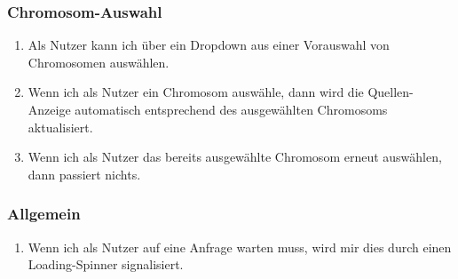 \subsubsection{Chromosom-Auswahl}
\begin{enumerate}
	\item Als Nutzer kann ich über ein Dropdown aus einer Vorauswahl von Chromosomen auswählen.
	\item Wenn ich als Nutzer ein Chromosom auswähle, dann wird die Quellen-Anzeige automatisch entsprechend des ausgewählten Chromosoms aktualisiert.
	\item Wenn ich als Nutzer das bereits ausgewählte Chromosom erneut auswählen, dann passiert nichts.
\end{enumerate}

\subsubsection{Allgemein}
\begin{enumerate}
	\item Wenn ich als Nutzer auf eine Anfrage warten muss, wird mir dies durch einen Loading-Spinner signalisiert.	
\end{enumerate}
\newpage


